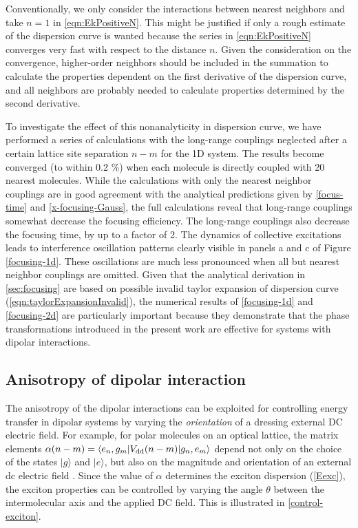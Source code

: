 Conventionally, we only consider the interactions between nearest neighbors and take $n=1$ in
 \autoref{eqn:EkPositiveN}. This might be justified if only a rough estimate of the dispersion curve is wanted
because the series in \autoref{eqn:EkPositiveN} converges very fast with respect to the distance $n$. Given the 
consideration on the convergence, higher-order neighbors should be included in the summation to calculate the properties 
dependent on the first derivative of the dispersion curve, and all neighbors are probably needed to calculate 
properties determined by the second derivative. 


To investigate the effect of this nonanalyticity in dispersion curve, we have performed a series of calculations with the long-range couplings neglected 
after a certain lattice site separation $n-m$ for the 1D system. The results become  converged (to within 0.2 \%) when
 each molecule is directly coupled with 20 nearest molecules. While the calculations with only the nearest neighbor
 couplings are in good agreement  with the analytical predictions given by \autoref{focus-time} and \autoref{x-focusing-Gauss}, the full calculations reveal that long-range 
couplings somewhat decrease the focusing efficiency. The long-range couplings also decrease the focusing time, 
by up to a factor of 2. The dynamics of collective excitations leads to interference oscillation patterns clearly 
visible in panels a and c of Figure \ref{focusing-1d}. These oscillations are much less pronounced when all but nearest
 neighbor couplings are omitted. Given that the analytical derivation in \autoref{sec:focusing} are based on possible 
invalid taylor expansion of dispersion curve (\autoref{eqn:taylorExpansionInvalid}), the numerical results of 
\autoref{focusing-1d} and \autoref{focusing-2d} are particularly important
 because they demonstrate that the phase transformations introduced in the present work are effective  for 
systems with dipolar interactions. 

\subsection{Anisotropy of dipolar interaction}
\label{sec:anisotropy}

The anisotropy of the dipolar interactions can be exploited for controlling energy transfer in dipolar systems by varying the {\it orientation} of a dressing external DC electric field. 
For example,  for polar molecules on an optical lattice,  
the matrix elements  $\alpha(n-m) = \langle e_{n} , g_{m} | {V}_{\rm dd}(n-m) | g_{n}, e_{m} \rangle$ depend not only on the choice of
 the states $|g\rangle$ and $|e\rangle$, but also on the magnitude and orientation of an external dc electric field
\cite{biexcitons, felipe}. Since the value of $\alpha$ determines the exciton dispersion (\ref{Eexc}),
 the exciton properties can be controlled by varying the angle $\theta$ between the intermolecular axis
and the applied DC field. This is illustrated in \autoref{control-exciton}. 

